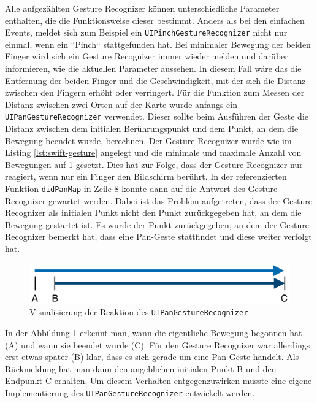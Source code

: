 Alle aufgezählten Gesture Recognizer können unterschiedliche Parameter enthalten, die die Funktionsweise dieser bestimmt.
Anders als bei den einfachen Events, meldet sich zum Beispiel ein \texttt{UIPinchGestureRecognizer} nicht nur einmal, wenn ein ``Pinch`` stattgefunden hat.
Bei minimaler Bewegung der beiden Finger wird sich ein Gesture Recognizer immer wieder melden und darüber informieren, wie die aktuellen Parameter aussehen.
In diesem Fall wäre das die Entfernung der beiden Finger und die Geschwindigkeit, mit der sich die Distanz zwischen den Fingern erhöht oder verringert.\pbreak%
%
Für die Funktion zum Messen der Distanz zwischen zwei Orten auf der Karte wurde anfangs ein \texttt{UIPanGestureRecognizer} verwendet.
Dieser sollte beim Ausführen der Geste die Distanz zwischen dem initialen Berührungspunkt und dem Punkt, an dem die Bewegung beendet wurde, berechnen.
Der Gesture Recognizer wurde wie im Listing \ref{lst:swift-gesture} angelegt und die minimale und maximale Anzahl von Bewegungen auf 1 gesetzt.
Dies hat zur Folge, dass der Gesture Recognizer nur reagiert, wenn nur ein Finger den Bildschirm berührt.
In der referenzierten Funktion \texttt{didPanMap} in Zeile 8 konnte dann auf die Antwort des Gesture Recognizer gewartet werden.\pbreak%
%
Dabei ist das Problem aufgetreten, dass der Gesture Recognizer als initialen Punkt nicht den Punkt zurückgegeben hat, an dem die Bewegung gestartet ist.
Es wurde der Punkt zurückgegeben, an dem der Gesture Recognizer bemerkt hat, dass eine Pan-Geste stattfindet und diese weiter verfolgt hat.
\begin{figure}[h]
	\centering
	\includegraphics[scale=0.25]{images/pangesture.png}
	\caption{Visualisierung der Reaktion des \texttt{UIPanGestureRecognizer}}
	\label{fig:pangesture}
\end{figure}
In der Abbildung \ref{fig:pangesture} erkennt man, wann die eigentliche Bewegung begonnen hat (A) und wann sie beendet wurde (C).
Für den Gesture Recognizer war allerdings erst etwas später (B) klar, dass es sich gerade um eine Pan-Geste handelt.
Als Rückmeldung hat man dann den angeblichen initialen Punkt B und den Endpunkt C erhalten.
Um diesem Verhalten entgegenzuwirken musste eine eigene Implementierung des \texttt{UIPanGestureRecognizer} entwickelt werden.

